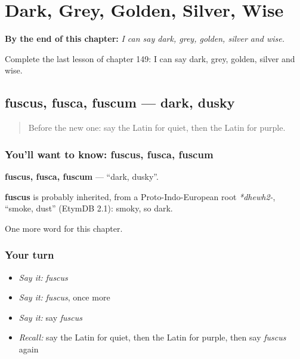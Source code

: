 
\chapter{Dark, Grey, Golden, Silver, Wise}
\label{ch:la-dark-grey-golden-silver-wise}

\begin{chapteropening}
\textbf{By the end of this chapter:} \emph{I can say dark, grey, golden, silver and wise.}

Complete the last lesson of chapter 149: I can say dark, grey, golden, silver and wise.
\end{chapteropening}

\section[fuscus, fusca, fuscum]{fuscus, fusca, fuscum — dark, dusky}

\label{lesson:LA-C149-fuscus}



\begin{quote}
Before the new one: say the Latin for quiet, then the Latin for purple.
\end{quote}

\subsection*{You'll want to know: fuscus, fusca, fuscum}
\textbf{fuscus, fusca, fuscum} — \textquotedblleft{}dark, dusky\textquotedblright{}.

\begin{cousinweb}
\textbf{fuscus} is probably inherited, from a Proto-Indo-European root \emph{*dhewh2-}, \textquotedblleft{}smoke, dust\textquotedblright{} (EtymDB 2.1): smoky, so dark.
\end{cousinweb}

\begin{grammarlens}[title={What you've built}]
One more word for this chapter.
\end{grammarlens}

\subsection*{Your turn}
\begin{itemize}
\raggedright
  \item \emph{Say it:} \emph{fuscus}
  \item \emph{Say it:} \emph{fuscus}, once more
  \item \emph{Say it:} say \emph{fuscus}
  \item \emph{Recall:} say the Latin for quiet, then the Latin for purple, then say \emph{fuscus} again
\end{itemize}

